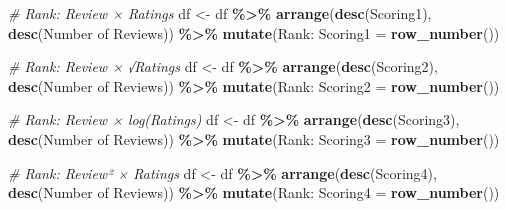 \documentclass[
]{article}
\newenvironment{Shaded}{\begin{snugshade}}{\end{snugshade}}
\newcommand{\AttributeTok}[1]{\textcolor[rgb]{0.13,0.29,0.53}{#1}}
\newcommand{\CommentTok}[1]{\textcolor[rgb]{0.56,0.35,0.01}{\textit{#1}}}
\newcommand{\FunctionTok}[1]{\textcolor[rgb]{0.13,0.29,0.53}{\textbf{#1}}}
\newcommand{\NormalTok}[1]{#1}
\newcommand{\OtherTok}[1]{\textcolor[rgb]{0.56,0.35,0.01}{#1}}
\newcommand{\SpecialCharTok}[1]{\textcolor[rgb]{0.81,0.36,0.00}{\textbf{#1}}}
\newcommand{\StringTok}[1]{\textcolor[rgb]{0.31,0.60,0.02}{#1}}
\begin{document}
\begin{Shaded}
\begin{Highlighting}[]
\CommentTok{\# Rank: Review × Ratings}
\NormalTok{df }\OtherTok{\textless{}{-}}\NormalTok{ df }\SpecialCharTok{\%\textgreater{}\%}
  \FunctionTok{arrange}\NormalTok{(}\FunctionTok{desc}\NormalTok{(}\StringTok{\textasciigrave{}}\AttributeTok{Scoring1}\StringTok{\textasciigrave{}}\NormalTok{), }\FunctionTok{desc}\NormalTok{(}\StringTok{\textasciigrave{}}\AttributeTok{Number of Reviews}\StringTok{\textasciigrave{}}\NormalTok{)) }\SpecialCharTok{\%\textgreater{}\%}
  \FunctionTok{mutate}\NormalTok{(}\StringTok{\textasciigrave{}}\AttributeTok{Rank: Scoring1}\StringTok{\textasciigrave{}} \OtherTok{=} \FunctionTok{row\_number}\NormalTok{())}

\CommentTok{\# Rank: Review × √Ratings}
\NormalTok{df }\OtherTok{\textless{}{-}}\NormalTok{ df }\SpecialCharTok{\%\textgreater{}\%}
  \FunctionTok{arrange}\NormalTok{(}\FunctionTok{desc}\NormalTok{(}\StringTok{\textasciigrave{}}\AttributeTok{Scoring2}\StringTok{\textasciigrave{}}\NormalTok{), }\FunctionTok{desc}\NormalTok{(}\StringTok{\textasciigrave{}}\AttributeTok{Number of Reviews}\StringTok{\textasciigrave{}}\NormalTok{)) }\SpecialCharTok{\%\textgreater{}\%}
  \FunctionTok{mutate}\NormalTok{(}\StringTok{\textasciigrave{}}\AttributeTok{Rank: Scoring2}\StringTok{\textasciigrave{}} \OtherTok{=} \FunctionTok{row\_number}\NormalTok{())}

\CommentTok{\# Rank: Review × log(Ratings)}
\NormalTok{df }\OtherTok{\textless{}{-}}\NormalTok{ df }\SpecialCharTok{\%\textgreater{}\%}
  \FunctionTok{arrange}\NormalTok{(}\FunctionTok{desc}\NormalTok{(}\StringTok{\textasciigrave{}}\AttributeTok{Scoring3}\StringTok{\textasciigrave{}}\NormalTok{), }\FunctionTok{desc}\NormalTok{(}\StringTok{\textasciigrave{}}\AttributeTok{Number of Reviews}\StringTok{\textasciigrave{}}\NormalTok{)) }\SpecialCharTok{\%\textgreater{}\%}
  \FunctionTok{mutate}\NormalTok{(}\StringTok{\textasciigrave{}}\AttributeTok{Rank: Scoring3}\StringTok{\textasciigrave{}} \OtherTok{=} \FunctionTok{row\_number}\NormalTok{())}

\CommentTok{\# Rank: Review² × Ratings}
\NormalTok{df }\OtherTok{\textless{}{-}}\NormalTok{ df }\SpecialCharTok{\%\textgreater{}\%}
  \FunctionTok{arrange}\NormalTok{(}\FunctionTok{desc}\NormalTok{(}\StringTok{\textasciigrave{}}\AttributeTok{Scoring4}\StringTok{\textasciigrave{}}\NormalTok{), }\FunctionTok{desc}\NormalTok{(}\StringTok{\textasciigrave{}}\AttributeTok{Number of Reviews}\StringTok{\textasciigrave{}}\NormalTok{)) }\SpecialCharTok{\%\textgreater{}\%}
  \FunctionTok{mutate}\NormalTok{(}\StringTok{\textasciigrave{}}\AttributeTok{Rank: Scoring4}\StringTok{\textasciigrave{}} \OtherTok{=} \FunctionTok{row\_number}\NormalTok{())}


\end{Highlighting}
\end{Shaded}
\end{document}
